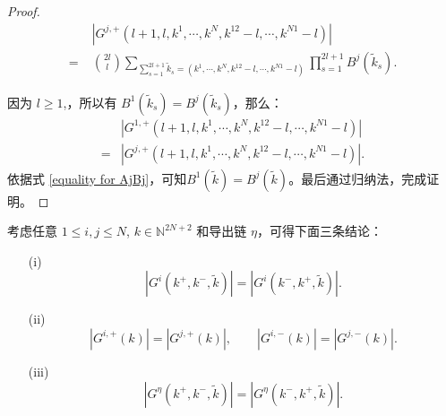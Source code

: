 \begin{proof}
	\begin{align*}
		&\;\left|G^{j,+}\left(l+1,l,k^1,\cdots,k^N,k^{12}-l,\cdots,k^{N1}-l\right)\right|\\
		=&\;\binom{2l}{l}\sum_{\sum_{s=1}^{2l+1}\tilde{k}_s=(k^1,\cdots,k^N,k^{12}-l,\cdots,k^{N1}-l)}\prod_{s=1}^{2l+1}B^j\left(\tilde{k}_s\right).
	\end{align*}
	
	因为 $l\ge 1$,，所以有 $B^1(\tilde{k}_s)=B^j(\tilde{k}_s)$，那么：
	\begin{align*}
		&\left|G^{1,+}\left(l+1,l,k^1,\cdots,k^N,k^{12}-l,\cdots,k^{N1}-l\right)\right|\\
		=&\left|G^{j,+}\left(l+1,l,k^1,\cdots,k^N,k^{12}-l,\cdots,k^{N1}-l\right)\right|.
	\end{align*}
	依据式 \eqref{equality for AjBj}，可知$B^1(\tilde{k})=B^j(\tilde{k})$。最后通过归纳法，完成证明。
\end{proof}
\begin{proposition}\label{proposition:E Gin}
	考虑任意 $1\le i,j\le N$, $k\in\mathbb{N}^{2N+2}$ 和导出链 $\eta$，可得下面三条结论：
	\begin{itemize}
		\item[(i)] 
		\begin{equation}\label{EGin}
			\left|G^i\left(k^+,k^-,\tilde{k}\right)\right|=\left|G^i\left(k^-,k^+,\tilde{k}\right)\right|.
		\end{equation}
		\item[(ii)] 
		\begin{equation}\label{E Gi1cdotsNn}
			\left|G^{i,+}(k)\right|=\left|G^{j,+}(k)\right|,\qquad\left|G^{i,-}(k)\right|=\left|G^{j,-}(k)\right|.
		\end{equation}
		\item[(iii)]  
		\begin{equation}\label{EGetan}
			\left|G^{\eta}\left(k^+,k^-,\tilde{k}\right)\right|=\left|G^{\eta}\left(k^-,k^+,\tilde{k}\right)\right|.
		\end{equation}
	\end{itemize}
\end{proposition}
